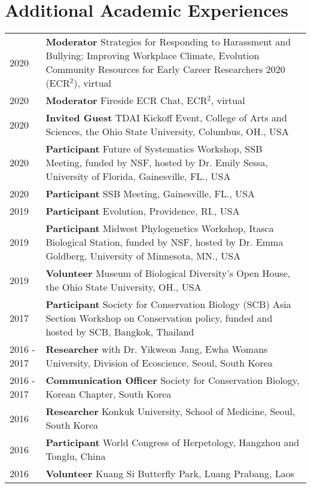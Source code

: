 \documentclass[11pt]{article}
\begin{document}
\hspace{0pt}

\section*{Additional Academic Experiences}

\begin{longtable}{p{}  p{}}

2020 &	\textbf{Moderator} Strategies for Responding to Harassment and Bullying: Improving Workplace Climate, Evolution Community Resources for Early Career Researchers 2020 (ECR$^2$), virtual\\
2020 &	\textbf{Moderator} Fireside ECR Chat, ECR$^2$, virtual\\
2020 &	\textbf{Invited Guest} TDAI Kickoff Event, College of Arts and Sciences, the Ohio State University, Columbus, OH., USA\\
2020 &	\textbf{Participant} Future of Systematics Workshop, SSB Meeting, funded by NSF, hosted by Dr. Emily Sessa, University of Florida, Gainesville, FL., USA\\
2020 &	\textbf{Participant} SSB Meeting, Gainesville, FL., USA\\
2019 &  \textbf{Participant} Evolution, Providence, RI., USA\\
2019 &	\textbf{Participant} Midwest Phylogenetics Workshop, Itasca Biological Station, funded by NSF, hosted by Dr. Emma Goldberg, University of Minnesota, MN., USA\\
2019 & \textbf{Volunteer} Museum of Biological Diversity’s Open House, the Ohio State University, OH., USA\\
2017 &	\textbf{Participant} Society for Conservation Biology (SCB) Asia Section Workshop on Conservation policy, funded and hosted by SCB, Bangkok, Thailand\\
2016 - 2017 & \textbf{Researcher} with Dr. Yikweon Jang, Ewha Womans University, Division of Ecoscience, Seoul, South Korea\\
2016 - 2017 &	\textbf{Communication Officer} Society for Conservation Biology, Korean Chapter, South Korea\\
2016 &	\textbf{Researcher} Konkuk University, School of Medicine, Seoul, South Korea\\
2016 &	\textbf{Participant} World Congress of Herpetology, Hangzhou and Tonglu, China\\
2016 &	\textbf{Volunteer} Kuang Si Butterfly Park, Luang Prabang, Laos\\

\end{longtable}
\end{document}
